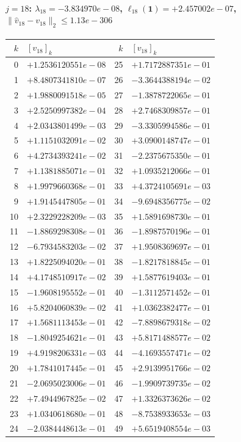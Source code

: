 \paragraph{$j = 18$: $\lambda_{18} = -3.834970e-08$, \quad $\ell_{18}(\mathbf{1}) = +2.457002e-07$, \quad $\|\hat{v}_{18} - v_{18}\|_2 \leq 1.13e-306$}
\begin{center}
{\footnotesize
\begin{tabular}{r@{\;\;}l@{\quad}r@{\;\;}l}
\toprule
$k$ & $[v_{18}]_k$ & $k$ & $[v_{18}]_k$ \\
\midrule
0 & $+1.2536120551e-08$ & 25 & $+1.7172887351e-01$ \\
1 & $+8.4807341810e-07$ & 26 & $-3.3644388194e-02$ \\
2 & $+1.9880091518e-05$ & 27 & $-1.3878722065e-01$ \\
3 & $+2.5250997382e-04$ & 28 & $+2.7468309857e-01$ \\
4 & $+2.0343801499e-03$ & 29 & $-3.3305994586e-01$ \\
5 & $+1.1151032091e-02$ & 30 & $+3.0900148747e-01$ \\
6 & $+4.2734393241e-02$ & 31 & $-2.2375675350e-01$ \\
7 & $+1.1381885071e-01$ & 32 & $+1.0935212066e-01$ \\
8 & $+1.9979660368e-01$ & 33 & $+4.3724105691e-03$ \\
9 & $+1.9145447805e-01$ & 34 & $-9.6948356775e-02$ \\
10 & $+2.3229228209e-03$ & 35 & $+1.5891698730e-01$ \\
11 & $-1.8869298308e-01$ & 36 & $-1.8987570196e-01$ \\
12 & $-6.7934583203e-02$ & 37 & $+1.9508369697e-01$ \\
13 & $+1.8225094020e-01$ & 38 & $-1.8217818845e-01$ \\
14 & $+4.1748510917e-02$ & 39 & $+1.5877619403e-01$ \\
15 & $-1.9608195552e-01$ & 40 & $-1.3112571452e-01$ \\
16 & $+5.8204060839e-02$ & 41 & $+1.0362382477e-01$ \\
17 & $+1.5681113453e-01$ & 42 & $-7.8898679318e-02$ \\
18 & $-1.8049254621e-01$ & 43 & $+5.8171488577e-02$ \\
19 & $+4.9198206331e-03$ & 44 & $-4.1693557471e-02$ \\
20 & $+1.7841017445e-01$ & 45 & $+2.9139951766e-02$ \\
21 & $-2.0695023006e-01$ & 46 & $-1.9909739735e-02$ \\
22 & $+7.4944967825e-02$ & 47 & $+1.3326373626e-02$ \\
23 & $+1.0340618680e-01$ & 48 & $-8.7538933653e-03$ \\
24 & $-2.0384448613e-01$ & 49 & $+5.6519408554e-03$ \\
\bottomrule
\end{tabular}
}
\end{center}

